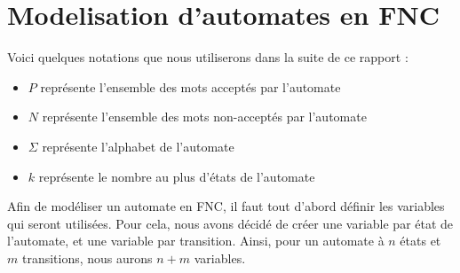\documentclass[a4paper, 12pt]{extarticle}
\begin{document}


\makemargins %
\makefrontpage


% 


\section{Modelisation d'automates en FNC} %
\label{sec:modelisation_d_automates_en_fnc_}


Voici quelques notations que nous utiliserons dans la suite de ce rapport : 
\begin{itemize}[label=$\bullet$]
    \item $P$ représente l'ensemble des mots acceptés par l'automate 
    \item $N$ représente l'ensemble des mots non-acceptés par l'automate 
    \item $\Sigma$ représente l'alphabet de l'automate 
    \item $k$ représente le nombre au plus d'états de l'automate
\end{itemize}

Afin de modéliser un automate en FNC, il faut tout d'abord définir les variables qui seront utilisées. 
Pour cela, nous avons décidé de créer une variable par état de l'automate, et une variable par transition. 
Ainsi, pour un automate à $n$ états et $m$ transitions, nous aurons $n+m$ variables. 
\end{document}
